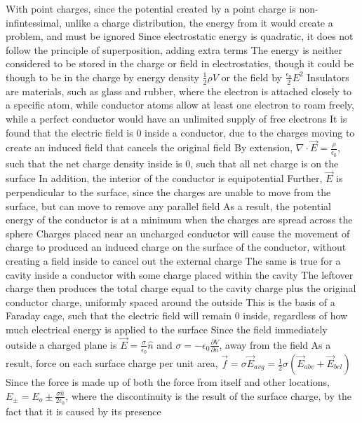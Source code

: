 \documentclass[11 pt, twoside]{article}
\newenvironment{outline*}
{
	\begin{outline}[enumerate]
	}
	{\end{outline}
}
\begin{document}
\begin{outline*}
		\3 With point charges, since the potential created by a point charge is non-infintessimal, unlike a charge distribution, the energy from it would create a problem, and must be ignored
	\2 Since electrostatic energy is quadratic, it does not follow the principle of superposition, adding extra terms
	\2 The energy is neither considered to be stored in the charge or field in electrostatics, though it could be though to be in the charge by energy density $\frac{1}{2}\rho V$ or the field by $\frac{\epsilon_0}{2}E^2$
\1 Insulators are materials, such as glass and rubber, where the electron is attached closely to a specific atom, while conductor atoms allow at least one electron to roam freely, while a perfect conductor would have an unlimited supply of free electrons
	\2 It is found that the electric field is 0 inside a conductor, due to the charges moving to create an induced field that cancels the original field
		\3 By extension, $\nabla \cdot \vec{E} = \frac{\rho}{\epsilon_0}$, such that the net charge density inside is 0, such that all net charge is on the surface
		\3 In addition, the interior of the conductor is equipotential
		\3 Further, $\vec{E}$ is perpendicular to the surface, since the charges are unable to move from the surface, but can move to remove any parallel field
		\3 As a result, the potential energy of the conductor is at a minimum when the charges are spread across the sphere
	\2 Charges placed near an uncharged conductor will cause the movement of charge to produced an induced charge on the surface of the conductor, without creating a field inside to cancel out the external charge
		\3 The same is true for a cavity inside a conductor with some charge placed within the cavity
			\4 The leftover charge then produces the total charge equal to the cavity charge plus the original conductor charge, uniformly spaced around the outside
		\3 This is the basis of a Faraday cage, such that the electric field will remain 0 inside, regardless of how much electrical energy is applied to the surface
	\2 Since the field immediately outside a charged plane is $\vec{E} = \frac{\sigma}{\epsilon_0}\hat{n}$ and $\sigma = -\epsilon_0 \frac{\partial V}{\partial n}$, away from the field
		\3 As a result, force on each surface charge per unit area, $\vec{f} = \sigma \vec{E}_{avg} = \frac{1}{2}\sigma(\vec{E}_{abv} + \vec{E}_{bel})$
			\4 Since the force is made up of both the force from itself and other locations, $E_{\pm} = E_o \pm \frac{\sigma \hat{n}}{2\epsilon_0}$, where the discontinuity is the result of the surface charge, by the fact that it is caused by its presence

\end{outline*}
\end{document}

